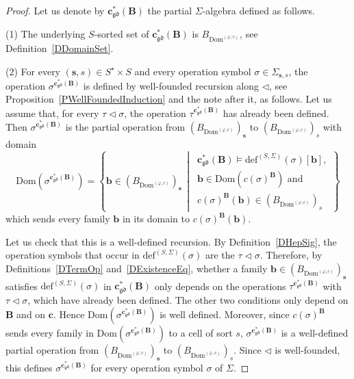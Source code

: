 \documentclass[a4paper, reqno]{amsbook}
\newcommand{\Dom}{\mathrm{Dom}}
\newcommand{\gd}{\mathfrak{gd}}              %
\theoremstyle{plain}
\theoremstyle{definition}
\begin{document}
\begin{proof}
Let us denote by $\mathbf{c}^{\ast}_{\gd}(\mathbf{B})$ the partial $\Sigma$-algebra defined as follows.

\textsf{(1)} The underlying $S$-sorted set of $\mathbf{c}^{\ast}_{\gd}(\mathbf{B})$ is $B_{\Dom^{(\varphi,c)}}$, see Definition~\ref{DDomainSet}.

\textsf{(2)} For every $(\mathbf{s},s)\in S^{\star}\times S$ and every operation symbol $\sigma\in\Sigma_{\mathbf{s},s}$, the operation $\sigma^{\mathbf{c}^{\ast}_{\gd}(\mathbf{B})}$ is defined by well-founded recursion along $\lhd$, see Proposition~\ref{PWellFoundedInduction} and the note after it, as follows.
Let us assume that, for every $\tau\lhd\sigma$, the operation $\tau^{\mathbf{c}^{\ast}_{\gd}(\mathbf{B})}$ has already been defined.
Then $\sigma^{\mathbf{c}^{\ast}_{\gd}(\mathbf{B})}$ is the partial operation from $(B_{\Dom^{(\varphi,c)}})_{\mathbf{s}}$ to $(B_{\Dom^{(\varphi,c)}})_{s}$ with domain
$$
\Dom\left(\sigma^{\mathbf{c}^{\ast}_{\gd}(\mathbf{B})}\right)
=
\left\lbrace
\mathbf{b}\in\left(B_{\Dom^{(\varphi,c)}}\right)_{\mathbf{s}}
\,\middle|\,
\begin{array}{l}
\mathbf{c}^{\ast}_{\gd}(\mathbf{B})\models\mathrm{def}^{(S,\Sigma)}(\sigma)[\mathbf{b}],\\
\mathbf{b}\in\Dom\left(c(\sigma)^{\mathbf{B}}\right)\text{ and}\\
c(\sigma)^{\mathbf{B}}(\mathbf{b})\in\left(B_{\Dom^{(\varphi,c)}}\right)_{s}
\end{array}
\right\rbrace
$$
which sends every family $\mathbf{b}$ in its domain to $c(\sigma)^{\mathbf{B}}(\mathbf{b})$.

Let us check that this is a well-defined recursion.
By Definition~\ref{DHepSig}, the operation symbols that occur in $\mathrm{def}^{(S,\Sigma)}(\sigma)$ are the $\tau\lhd\sigma$.
Therefore, by Definitions~\ref{DTermOp} and~\ref{DExistenceEq}, whether a family $\mathbf{b}\in(B_{\Dom^{(\varphi,c)}})_{\mathbf{s}}$ satisfies $\mathrm{def}^{(S,\Sigma)}(\sigma)$ in $\mathbf{c}^{\ast}_{\gd}(\mathbf{B})$ only depends on the operations $\tau^{\mathbf{c}^{\ast}_{\gd}(\mathbf{B})}$ with $\tau\lhd\sigma$, which have already been defined.
The other two conditions only depend on $\mathbf{B}$ and on $\mathbf{c}$.
Hence $\Dom(\sigma^{\mathbf{c}^{\ast}_{\gd}(\mathbf{B})})$ is well defined.
Moreover, since $c(\sigma)^{\mathbf{B}}$ sends every family in $\Dom(\sigma^{\mathbf{c}^{\ast}_{\gd}(\mathbf{B})})$ to a cell of sort $s$, $\sigma^{\mathbf{c}^{\ast}_{\gd}(\mathbf{B})}$ is a well-defined partial operation from $(B_{\Dom^{(\varphi,c)}})_{\mathbf{s}}$ to $(B_{\Dom^{(\varphi,c)}})_{s}$.
Since $\lhd$ is well-founded, this defines $\sigma^{\mathbf{c}^{\ast}_{\gd}(\mathbf{B})}$ for every operation symbol $\sigma$ of $\Sigma$.


\end{proof}
\end{document}
